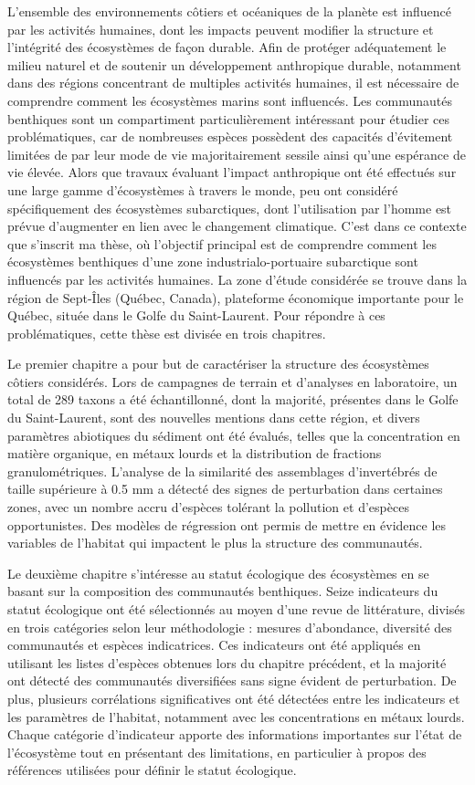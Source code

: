 L'ensemble des environnements côtiers et océaniques de la planète est
influencé par les activités humaines, dont les impacts peuvent modifier
la structure et l'intégrité des écosystèmes de façon durable. Afin de
protéger adéquatement le milieu naturel et de soutenir un développement
anthropique durable, notamment dans des régions concentrant de multiples
activités humaines, il est nécessaire de comprendre comment les
écosystèmes marins sont influencés. Les communautés benthiques sont un
compartiment particulièrement intéressant pour étudier ces
problématiques, car de nombreuses espèces possèdent des capacités
d'évitement limitées de par leur mode de vie majoritairement sessile
ainsi qu'une espérance de vie élevée. Alors que travaux évaluant
l'impact anthropique ont été effectués sur une large gamme d'écosystèmes
à travers le monde, peu ont considéré spécifiquement des écosystèmes
subarctiques, dont l'utilisation par l'homme est prévue d'augmenter en
lien avec le changement climatique. C'est dans ce contexte que s'inscrit
ma thèse, où l'objectif principal est de comprendre comment les
écosystèmes benthiques d'une zone industrialo-portuaire subarctique sont
influencés par les activités humaines. La zone d'étude considérée se
trouve dans la région de Sept-Îles (Québec, Canada), plateforme
économique importante pour le Québec, située dans le Golfe du
Saint-Laurent. Pour répondre à ces problématiques, cette thèse est
divisée en trois chapitres.

Le premier chapitre a pour but de caractériser la structure des
écosystèmes côtiers considérés. Lors de campagnes de terrain et
d'analyses en laboratoire, un total de 289 taxons a été échantillonné,
dont la majorité, présentes dans le Golfe du Saint-Laurent, sont des
nouvelles mentions dans cette région, et divers paramètres abiotiques du
sédiment ont été évalués, telles que la concentration en matière
organique, en métaux lourds et la distribution de fractions
granulométriques. L'analyse de la similarité des assemblages
d'invertébrés de taille supérieure à 0.5 mm a détecté des signes de
perturbation dans certaines zones, avec un nombre accru d'espèces
tolérant la pollution et d'espèces opportunistes. Des modèles de
régression ont permis de mettre en évidence les variables de l'habitat
qui impactent le plus la structure des communautés.

Le deuxième chapitre s'intéresse au statut écologique des écosystèmes en
se basant sur la composition des communautés benthiques. Seize
indicateurs du statut écologique ont été sélectionnés au moyen d'une
revue de littérature, divisés en trois catégories selon leur
méthodologie : mesures d'abondance, diversité des communautés et espèces
indicatrices. Ces indicateurs ont été appliqués en utilisant les listes
d'espèces obtenues lors du chapitre précédent, et la majorité ont
détecté des communautés diversifiées sans signe évident de perturbation.
De plus, plusieurs corrélations significatives ont été détectées entre
les indicateurs et les paramètres de l'habitat, notamment avec les
concentrations en métaux lourds. Chaque catégorie d'indicateur apporte
des informations importantes sur l'état de l'écosystème tout en
présentant des limitations, en particulier à propos des références
utilisées pour définir le statut écologique.

